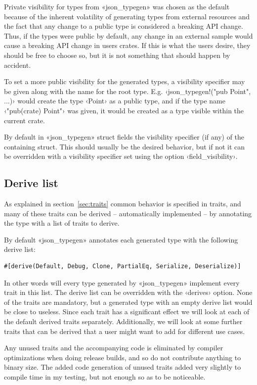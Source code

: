 Private visibility for types from «json_typegen» was chosen as the default because of the inherent volatility of generating types from external resources and the fact that any change to a public type is considered a breaking API change. Thus, if the types were public by default, any change in an external sample would cause a breaking API change in users crates. If this is what the users desire, they should be free to choose so, but it is not something that should happen by accident.

To set a more public visibility for the generated types, a visibility specifier may be given along with the name for the root type. E.g. ‹json_typegen!("pub Point", ...)› would create the type ‹Point› as a public type, and if the type name ‹"pub(crate) Point"› was given, it would be created as a type visible within the current crate.

By default in «json_typegen» struct fields  the visibility specifier (if any) of the containing struct. This should usually be the desired behavior, but if not it can be overridden with a visibility specifier set using the option ‹field_visibility›.

\subsection{Derive list}
\label{sec:derive-list}

As explained in section~\ref{sec:traits} common behavior is specified in traits, and many of these traits can be derived -- automatically implemented -- by annotating the type with a list of traits to derive.

By default «json_typegen» annotates each generated type with the following derive list:

\begin{verbatim}
#[derive(Default, Debug, Clone, PartialEq, Serialize, Deserialize)]
\end{verbatim}

In other words will every type generated by «json_typegen» implement every trait in this list. The derive list can be overridden with the ‹derives› option. None of the traits are mandatory, but a generated type with an empty derive list would be close to useless. Since each trait has a significant effect we will look at each of the default derived traits separately. Additionally, we will look at some further traits that can be derived that a user might want to add for different use cases.

Any unused traits and the accompanying code is eliminated by compiler optimizations when doing release builds, and so do not contribute anything to binary size. The added code generation of unused traits added very slightly to compile time in my testing, but not enough so as to be noticeable.

